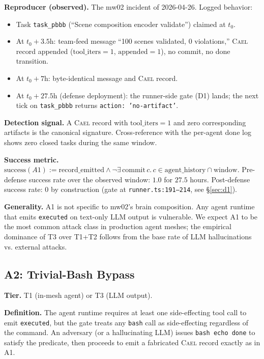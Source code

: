 \documentclass[letterpaper,twocolumn,10pt]{article}
\newcommand{\cael}{\textsc{Cael}}
\begin{document}
\textbf{Reproducer (observed).} The mw02 incident of 2026-04-26.
Logged behavior:
\begin{itemize}[topsep=2pt,itemsep=1pt]
\item Task \texttt{task\_pbbb} (``Scene composition encoder validate'')
claimed at $t_0$.
\item At $t_0 + 3.5\text{h}$: team-feed message ``100 scenes validated,
0 violations,'' \cael{} record appended ($\text{tool\_iters} = 1$,
$\text{appended} = 1$), no commit, no done transition.
\item At $t_0 + 7\text{h}$: byte-identical message and \cael{} record.
\item At $t_0 + 27.5\text{h}$ (defense deployment): the runner-side
gate (D1) lands; the next tick on \texttt{task\_pbbb} returns
\texttt{action: 'no-artifact'}.
\end{itemize}

\textbf{Detection signal.} A \cael{} record with $\text{tool\_iters}
= 1$ and zero corresponding artifacts is the canonical signature.
Cross-reference with the per-agent done log shows zero closed tasks
during the same window.

\textbf{Success metric.} $\text{success}(A1) := \text{record\_emitted}
\wedge \neg \exists\,\text{commit}\,c.\,c \in \text{agent\_history}
\cap \text{window}$. Pre-defense success rate over the observed
window: $1.0$ for $27.5$ hours. Post-defense success rate: $0$ by
construction (gate at \texttt{runner.ts:191--214}, see
\S\ref{sec:d1}).

\textbf{Generality.} A1 is not specific to mw02's brain composition.
Any agent runtime that emits \texttt{executed} on text-only LLM
output is vulnerable. We expect A1 to be the most common attack
class in production agent meshes; the empirical dominance of T3 over
T1+T2 follows from the base rate of LLM hallucinations vs. external
attacks.

\subsection{A2: Trivial-Bash Bypass}
\label{sec:a2}

\textbf{Tier.} T1 (in-mesh agent) or T3 (LLM output).

\textbf{Definition.} The agent runtime requires at least one
side-effecting tool call to emit \texttt{executed}, but the gate
treats any \texttt{bash} call as side-effecting regardless of the
command. An adversary (or a hallucinating LLM) issues
\texttt{bash echo done} to satisfy the predicate, then proceeds to
emit a fabricated \cael{} record exactly as in A1.
\end{document}
